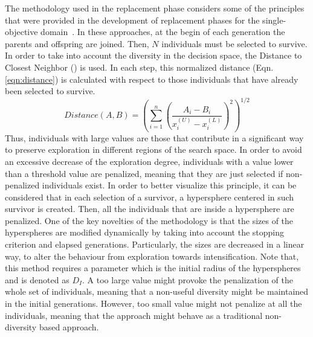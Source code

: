 The methodology used in the replacement phase considers some of the principles that were provided in the 
development of replacement phases for the single-objective domain~\cite{Joel:MULTI_DYNAMIC}.
%
%
In these approaches, at the begin of each generation the parents and offspring are joined.
%
Then, $N$ individuals must be selected to survive.
%
In order to take into account the diversity in the decision space, the 
Distance to Closest Neighbor (\DCN{}) is used.
%
In each step, this normalized distance (Eqn. \ref{eqn:distance}) is calculated with respect to those individuals that have already been selected to survive.
%
\begin{equation}\label{eqn:distance}
Distance(A, B) = \left (\sum_{i=1}^n \left ( \frac{A_i - B_i}{x_i^{(U)} - x_i^{(L)}} \right )^2  \right)^{1/2}
\end{equation}
Thus, individuals with large \DCN{} values are those that contribute in a significant way to preserve exploration in different regions of the search space.
%
In order to avoid an excessive decrease of the exploration degree, individuals with a \DCN{} value lower than a threshold value are penalized, meaning that
they are just selected if non-penalized individuals exist.
%
In order to better visualize this principle, it can be considered that in each selection of a survivor, a hypersphere centered in such survivor is created.
%
Then, all the individuals that are inside a hypersphere are penalized.
%
One of the key novelties of the methodology is that the sizes of the hyperspheres are modified dynamically by taking into account the stopping criterion
and elapsed generations.
%
Particularly, the sizes are decreased in a linear way, to alter the behaviour from exploration towards intensification.
%
Note that, this method requires a parameter which is the initial radius of the hyperspheres and is denoted as $D_I$. 
%
A too large value might provoke the penalization of the whole set of individuals, meaning that a non-useful diversity might be maintained in the initial generations.
%
However, too small value might not penalize at all the individuals, meaning that the approach might behave as a traditional non-diversity based approach.

